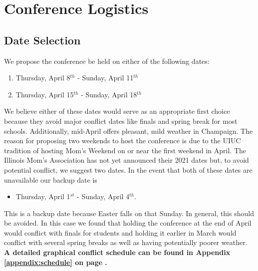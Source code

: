 
\section{Conference Logistics}

\subsection{Date Selection}


We propose the conference be held on either of the following dates: 
\begin{enumerate}
	\item Thursday, April 8$^{th}$ - Sunday, April 11$^{th}$ 
	\item Thursday, April 15$^{th}$ - Sunday, April 18$^{th}$
\end{enumerate}
We believe either of these dates would serve as an appropriate first choice because they avoid major conflict dates like finals and spring break for most schools. Additionally, mid-April offers pleasant, mild weather in Champaign. The reason for proposing two weekends to host the conference is due to the UIUC tradition of hosting Mom's Weekend on or near the first weekend in April. The Illinois Mom's Association has not yet announced their 2021 dates but, to avoid potential conflict, we suggest two dates. In the event that both of these dates are unavailable our backup date is 
\begin{itemize}
	\item Thursday, April 1$^{st}$ - Sunday, April 4$^{th}$.  
\end{itemize}
This is a backup date because Easter falls on that Sunday. In general, this 
should be avoided. In this case we found that holding the conference at the end 
of April would conflict with finals for students and holding it earlier in 
March would conflict with several spring breaks as well as having potentially 
poorer weather. \textbf{A detailed graphical conflict schedule can be found in Appendix 
\ref{appendix:schedule} on page \pageref{appendix:schedule}.} 

